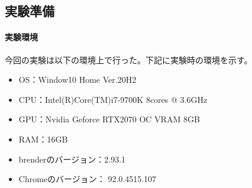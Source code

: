 \documentclass[dvipdfmx]{jsarticle}
\begin{document}
  \subsection{実験準備}
  \paragraph{実験環境}
    今回の実験は以下の環境上で行った。下記に実験時の環境を示す。
    \begin{itemize}
      \item OS：Window10 Home Ver.20H2
      \item CPU：Intel(R)Core(TM)i7-9700K 8cores @ 3.6GHz
      \item GPU：Nvidia Geforce RTX2070 OC VRAM 8GB
      \item RAM：16GB
      \item brenderのバージョン：2.93.1
      \item Chromeのバージョン： 92.0.4515.107
    \end{itemize}
\end{document}
